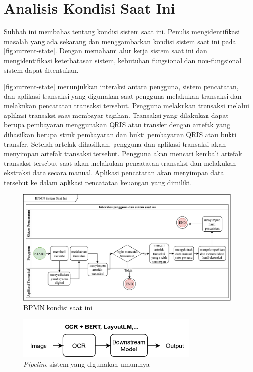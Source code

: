 \section{Analisis Kondisi Saat Ini}
\label{sec:analisis-kondisi-saat-ini}

Subbab ini membahas tentang kondisi sistem saat ini. Penulis mengidentifikasi masalah yang ada sekarang dan menggambarkan kondisi sistem saat ini pada \autoref{fig:current-state}. Dengan memahami alur kerja sistem saat ini dan mengidentifikasi keterbatasan sistem, kebutuhan fungsional dan non-fungsional sistem dapat ditentukan.

\autoref{fig:current-state} menunjukkan interaksi antara pengguna, sistem pencatatan, dan aplikasi transaksi yang digunakan saat pengguna melakukan transaksi dan melakukan pencatatan transaksi tersebut. Pengguna melakukan transaksi melalui aplikasi transaksi saat membayar tagihan. Transaksi yang dilakukan dapat berupa pembayaran menggunakan QRIS atau transfer dengan artefak yang dihasilkan berupa struk pembayaran dan bukti pembayaran QRIS atau bukti transfer. Setelah artefak dihasilkan, pengguna dan aplikasi transaksi akan menyimpan artefak transaksi tersebut. Pengguna akan mencari kembali artefak transaksi tersebut saat akan melakukan pencatatan transaksi dan melakukan ekstraksi data secara manual. Aplikasi pencatatan akan menyimpan data tersebut ke dalam aplikasi pencatatan keuangan yang dimiliki.
\begin{figure}[htbp]
    \centering
    \includegraphics[width=.925\textwidth]{images/current-state.png}
    \caption{BPMN kondisi saat ini}
    \label{fig:current-state}
\end{figure}

\begin{figure}[htbp]
    \centering
    \includegraphics[width=0.8\textwidth]{images/non-donut-pipeline.png}
    \caption{\emph{Pipeline} sistem yang digunakan umumnya}
    \label{fig:non-donut-pipeline}
\end{figure}

